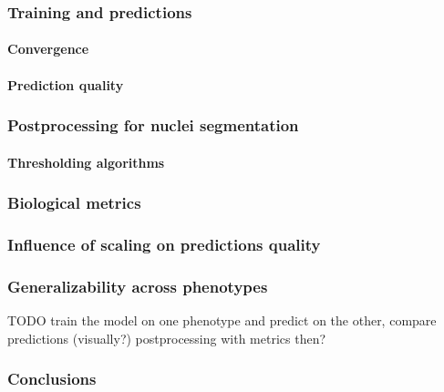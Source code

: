     \subsubsection{Training and predictions}
        \paragraph{Convergence}
              
        \paragraph{Prediction quality}
            \label{section:nuclei-predictions}
              
    \subsubsection{Postprocessing for nuclei segmentation}
        
        \paragraph{Thresholding algorithms}
        
    \subsubsection{Biological metrics}
        
    \subsubsection{Influence of scaling on predictions quality}
        
    \subsubsection{Generalizability across phenotypes}
        TODO train the model on one phenotype and predict on the other, compare predictions (visually?)
        postprocessing with metrics then?

    \subsubsection{Conclusions}
        
